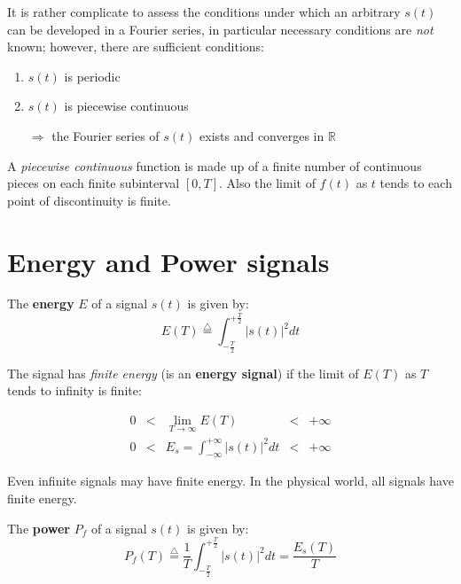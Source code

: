 It is rather complicate to assess the conditions under which an arbitrary $s(t)$ can be developed in a Fourier series, in particular necessary conditions are \textit{not} known; however, there are sufficient conditions:
\begin{theorem}[Dirichlet]
   \begin{enumerate}
      \item $s(t)$ is periodic
      \item $s(t)$ is piecewise continuous
      \item[$\Rightarrow$] the Fourier series of $s(t)$ exists and converges in $\mathbb{R}$
   \end{enumerate}
   \end{theorem}
A \textit{piecewise continuous} function is made up of a finite number of continuous pieces on each finite subinterval $[0,T]$. Also the
limit of $f(t)$ as $t$ tends to each point of discontinuity is finite.

\section{Energy and Power signals}
\begin{definition}[Energy]
   The \textbf{energy} $E$ of a signal $s(t)$ is given by:
   \begin{equation}
      E(T) \stackrel{\triangle}{=} \int_{-\frac{T}{2}}^{+\frac{T}{2}} |s(t)|^2 dt
   \end{equation}
\end{definition}

The signal has \textit{finite energy} (is an \textbf{energy signal}) if the limit of $E(T)$ as $T$ tends to infinity is finite:

\begin{align}
0 & < & \lim_{T \to \infty} E(T) &< & +\infty\\
0 & < & E_s = \int_{-\infty}^{+\infty} |s(t)|^2 dt &< & +\infty
\end{align}

Even infinite signals may have finite energy. In the physical world, all signals have finite energy.

\nl

\begin{definition}[Power]
   The \textbf{power} $P_f$ of a signal $s(t)$ is given by:
   \begin{equation}
   P_f(T) \stackrel{\triangle}{=} \frac{1}{T} \int_{-\frac{T}{2}}^{+\frac{T}{2}} |s(t)|^2 dt = \frac{E_s(T)}{T}
   \end{equation}
\end{definition}

